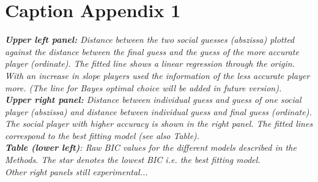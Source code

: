 \documentclass[jou]{apa}
\begin{document}
\section{Caption Appendix 1}
\textit{\textbf{Upper left panel:} Distance between the two social guesses (abszissa) plotted against the distance between the final guess and the guess of the more accurate player (ordinate). The fitted line shows a linear regression through the origin.  With an increase in slope players used the information of the less accurate player more. (The line for Bayes optimal choice will be added in future version).\\ \textbf{Upper right panel:} Distance between individual guess and guess of one social player (abszissa) and distance between individual guess and final guess (ordinate). The social player with higher accuracy is shown in the right panel. The fitted lines correspond to the best fitting model (see also Table).\\ \textbf{Table (lower left)}: Raw BIC values for the different models described in the Methods. The star denotes the lowest BIC i.e. the best fitting model.\\
Other right panels still experimental... }


\end{document}

